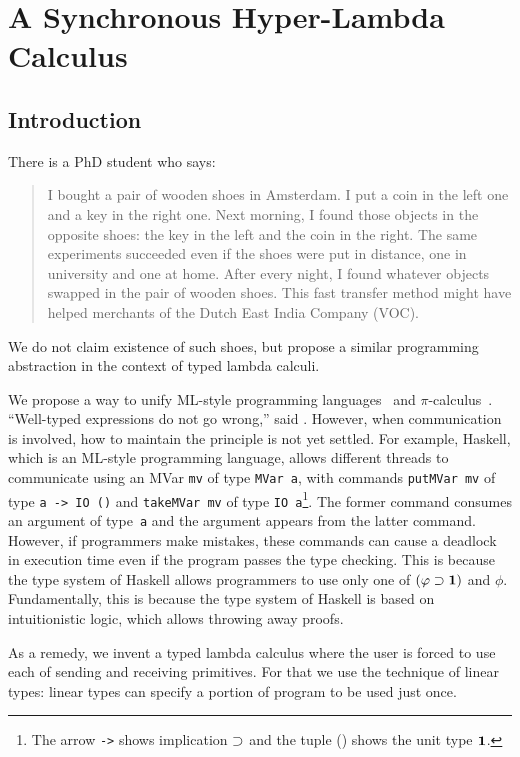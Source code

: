 \chapter{A Synchronous Hyper-Lambda Calculus}
\label{ch:exchange}

\section{Introduction}

There is a PhD student who says:
\begin{quotation}
 I bought a pair of wooden shoes in Amsterdam.  I put
 a coin in the left one and a key in the right one.
 Next morning, I found those objects in the opposite shoes:
 the key in the left and the coin in the right.
 The same experiments succeeded even if the shoes were put in distance, one in
 university and one at home.  After every night, I found whatever objects swapped in
 the pair of wooden shoes.
 This fast transfer method might have helped merchants of
 the Dutch East India Company (VOC).
\end{quotation}
We do not claim existence of such shoes, but propose
a similar programming abstraction in the context of typed lambda calculi.

We propose a way to unify ML-style programming
languages~\citep{milner1997definition, marlow2010haskell} and
$\pi$-calculus~\citep{milner1999communicating}.
``Well-typed expressions do not go wrong,'' said \citet{milner1978}.
However, when communication is involved, how to maintain the principle
is not yet settled.
For example, Haskell, which is an ML-style programming language,
allows different threads to communicate using an MVar \texttt{mv} of
type \texttt{MVar
a}, with commands
\texttt{putMVar mv} of type \texttt{a -> IO ()} and \texttt{takeMVar mv}
of type \texttt{IO
a}\footnote{The arrow \texttt{->} shows implication $\supset$ and the tuple
() shows the unit type $\mathbf{1}$.}.
The former command consumes an argument of type~\texttt{a} and
the argument appears from the latter command.
However, if programmers make mistakes, these commands can
cause a deadlock in execution time even if the program passes the type
checking.
This is because the type system of Haskell allows programmers to
use only one of $(\varphi\supset \mathbf{1})$ and $\phi$.
Fundamentally, this is because the type system of Haskell
is based on intuitionistic logic, which allows throwing away proofs.

As a remedy, we invent a typed lambda calculus where
the user is forced to use each of sending and receiving primitives.
For that we use the technique of linear types:
linear types can specify a portion of program to be used
just once.

